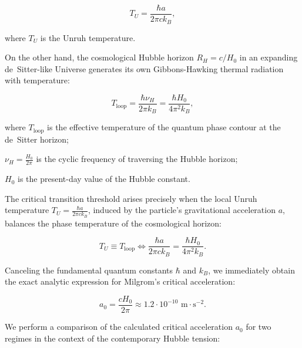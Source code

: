 \documentclass[11pt,a4paper]{article}
\theoremstyle{definition}
\begin{document}
\begin{equation}\label{eq:4.3}\tag{4.3}
T_U = \frac{\hbar a}{2\pi c k_B},
\end{equation}

where $T_U$ is the Unruh temperature.

On the other hand, the cosmological Hubble horizon $R_H = c/H_0$ in an expanding de~Sitter-like Universe generates its own Gibbons-Hawking thermal radiation \cite{ref25} with temperature:

\begin{equation}\label{eq:4.4}\tag{4.4}
T_{\text{loop}} = \frac{\hbar \nu_H}{2\pi k_B} = \frac{\hbar H_0}{4\pi^2 k_B},
\end{equation}

where $T_{\text{loop}}$ is the effective temperature of the quantum phase contour at the de~Sitter horizon;  

$\nu_H = \frac{H_0}{2\pi}$ is the cyclic frequency of traversing the Hubble horizon;  

$H_0$ is the present-day value of the Hubble constant.

The critical transition threshold arises precisely when the local Unruh temperature $T_U = \frac{\hbar a}{2\pi c k_B}$, induced by the particle's gravitational acceleration $a$, balances the phase temperature of the cosmological horizon:

\begin{equation}\label{eq:4.5}\tag{4.5}
T_U \equiv T_{\text{loop}} \iff \frac{\hbar a}{2\pi c k_B} = \frac{\hbar H_0}{4\pi^2 k_B}.
\end{equation}

Canceling the fundamental quantum constants $\hbar$ and $k_B$, we immediately obtain the exact analytic expression for Milgrom's critical acceleration:

\begin{equation}\label{eq:4.6}\tag{4.6}
a_0 = \frac{c H_0}{2\pi} \approx 1.2 \cdot 10^{-10}\text{ m}\cdot\text{s}^{-2}.
\end{equation}

We perform a comparison of the calculated critical acceleration $a_0$ for two regimes in the context of the contemporary Hubble tension:
\end{document}
